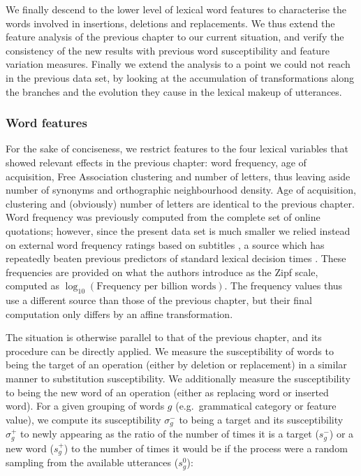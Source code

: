 \documentclass[a4paper,fleqn]{cas-dc}
\begin{document}
We finally descend to the lower level of lexical word features to
characterise the words involved in insertions, deletions and
replacements. We thus extend the feature analysis of the previous
chapter to our current situation, and verify the consistency of the new
results with previous word susceptibility and feature variation
measures. Finally we extend the analysis to a point we could not reach
in the previous data set, by looking at the accumulation of
transformations along the branches and the evolution they cause in the
lexical makeup of utterances.

\subsubsection{Word features}\label{word-features}

For the sake of conciseness, we restrict features to the four lexical
variables that showed relevant effects in the previous chapter: word
frequency, age of acquisition, Free Association clustering and number of
letters, thus leaving aside number of synonyms and orthographic
neighbourhood density. Age of acquisition, clustering and (obviously)
number of letters are identical to the previous chapter. Word frequency
was previously computed from the complete set of online quotations;
however, since the present data set is much smaller we relied instead on
external word frequency ratings based on subtitles
\citep{heuven_subtlex-uk:_2014}, a source which has repeatedly beaten
previous predictors of standard lexical decision times \citep[see][
for more details]{heuven_subtlex-uk:_2014}. These frequencies are
provided on what the authors introduce as the Zipf scale, computed as
\(\log_{10}(\text{Frequency per billion words})\). The frequency values
thus use a different source than those of the previous chapter, but
their final computation only differs by an affine transformation.

The situation is otherwise parallel to that of the previous chapter, and
its procedure can be directly applied. We measure the susceptibility of
words to being the target of an operation (either by deletion or
replacement) in a similar manner to substitution susceptibility. We
additionally measure the susceptibility to being the new word of an
operation (either as replacing word or inserted word). For a given
grouping of words \(g\) (e.g.~grammatical category or feature value), we
compute its susceptibility \(\sigma_g^-\) to being a target and its
susceptibility \(\sigma_g^+\) to newly appearing as the ratio of the
number of times it is a target (\(s_g^-\)) or a new word (\(s_g^+\)) to
the number of times it would be if the process were a random sampling
from the available utterances (\(s_g^0\)):
\end{document}
